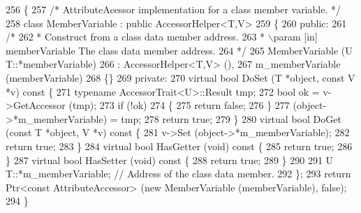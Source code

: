 \begin{DoxyCode}
256 \{
257   \textcolor{comment}{/* AttributeAcessor implementation for a class member variable. */}
258   \textcolor{keyword}{class }MemberVariable : \textcolor{keyword}{public} AccessorHelper<T,V>
259   \{
260 \textcolor{keyword}{public}:
261     \textcolor{comment}{/*}
262 \textcolor{comment}{     * Construct from a class data member address.}
263 \textcolor{comment}{     * \(\backslash\)param [in] memberVariable The class data member address.}
264 \textcolor{comment}{     */}
265     MemberVariable (U T::*memberVariable)
266       : AccessorHelper<T,V> (),
267         m\_memberVariable (memberVariable)
268     \{\}
269 \textcolor{keyword}{private}:
270     \textcolor{keyword}{virtual} \textcolor{keywordtype}{bool} DoSet (T *\textcolor{keywordtype}{object}, \textcolor{keyword}{const} V *v)\textcolor{keyword}{ const }\{
271       \textcolor{keyword}{typename} AccessorTrait<U>::Result tmp;
272       \textcolor{keywordtype}{bool} ok = v->GetAccessor (tmp);
273       \textcolor{keywordflow}{if} (!ok)
274         \{
275           \textcolor{keywordflow}{return} \textcolor{keyword}{false};
276         \}
277       (\textcolor{keywordtype}{object}->*m\_memberVariable) = tmp;
278       \textcolor{keywordflow}{return} \textcolor{keyword}{true};
279     \}
280     \textcolor{keyword}{virtual} \textcolor{keywordtype}{bool} DoGet (\textcolor{keyword}{const} T *\textcolor{keywordtype}{object}, V *v)\textcolor{keyword}{ const }\{
281       v->Set (object->*m\_memberVariable);
282       \textcolor{keywordflow}{return} \textcolor{keyword}{true};
283     \}
284     \textcolor{keyword}{virtual} \textcolor{keywordtype}{bool} HasGetter (\textcolor{keywordtype}{void})\textcolor{keyword}{ const }\{
285       \textcolor{keywordflow}{return} \textcolor{keyword}{true};
286     \}
287     \textcolor{keyword}{virtual} \textcolor{keywordtype}{bool} HasSetter (\textcolor{keywordtype}{void})\textcolor{keyword}{ const }\{
288       \textcolor{keywordflow}{return} \textcolor{keyword}{true};
289     \}
290 
291     U T::*m\_memberVariable;  \textcolor{comment}{// Address of the class data member.}
292   \};
293   \textcolor{keywordflow}{return} Ptr<const AttributeAccessor> (\textcolor{keyword}{new} MemberVariable (memberVariable), \textcolor{keyword}{false});
294 \}
\end{DoxyCode}
